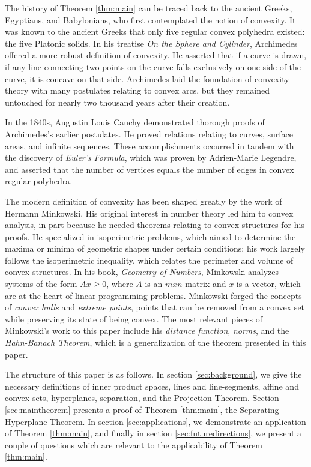 \documentclass[11pt,reqno]{amsart}
\theoremstyle{plain}
\theoremstyle{definition}
\begin{document}
{
\setlength{\parskip}{8pt}
The history of Theorem \ref{thm:main} can be traced back to the ancient Greeks, Egyptians, and Babylonians, who first contemplated the notion of convexity. It was known to the ancient Greeks that only five regular convex polyhedra existed: the five Platonic solids. In his treatise \emph{On the Sphere and Cylinder}, Archimedes offered a more robust definition of convexity. He asserted that if a curve is drawn, if any line connecting two points on the curve falls exclusively on one side of the curve, it is concave on that side. Archimedes laid the foundation of convexity theory with many postulates relating to convex arcs, but they remained untouched for nearly two thousand years after their creation.\cite{roman}

In the 1840s, Augustin Louis Cauchy demonstrated thorough proofs of Archimedes's earlier postulates. He proved relations relating to curves, surface areas, and infinite sequences. These accomplishments occurred in tandem with the discovery of \emph{Euler's Formula}, which was proven by Adrien-Marie Legendre, and asserted that the number of vertices equals the number of edges in convex regular polyhedra.\cite{roman}

The modern definition of convexity has been shaped greatly by the work of Hermann Minkowski. His original interest in number theory led him to convex analysis, in part because he needed theorems relating to convex structures for his proofs. He specialized in isoperimetric problems, which aimed to determine the maxima or minima of geometric shapes under certain conditions; his work largely follows the isoperimetric inequality, which relates the perimeter and volume of convex structures. In his book, \emph{Geometry of Numbers}, Minkowski analyzes systems of the form $Ax \geq 0$, where $A$ is an $m x n$ matrix and $x$ is a vector, which are at the heart of linear programming problems. Minkowski forged the concepts of \emph{convex hulls} and \emph{extreme points}, points that can be removed from a convex set while preserving its state of being convex. The most relevant pieces of Minkowski's work to this paper include his \emph{distance function}, \emph{norms}, and the \emph{Hahn-Banach Theorem}, which is a generalization of the theorem presented in this paper.\cite{roman}

The structure of this paper is as follows. In section \ref{sec:background}, we give the necessary definitions of inner product spaces, lines and line-segments, affine and convex sets, hyperplanes, separation, and the Projection Theorem. Section \ref{sec:maintheorem} presents a proof of Theorem \ref{thm:main}, the Separating Hyperplane Theorem. In section \ref{sec:applications}, we demonstrate an application of Theorem \ref{thm:main}, and finally in section \ref{sec:futuredirections}, we present a couple of questions which are relevant to the applicability of Theorem \ref{thm:main}.

}
\end{document}
